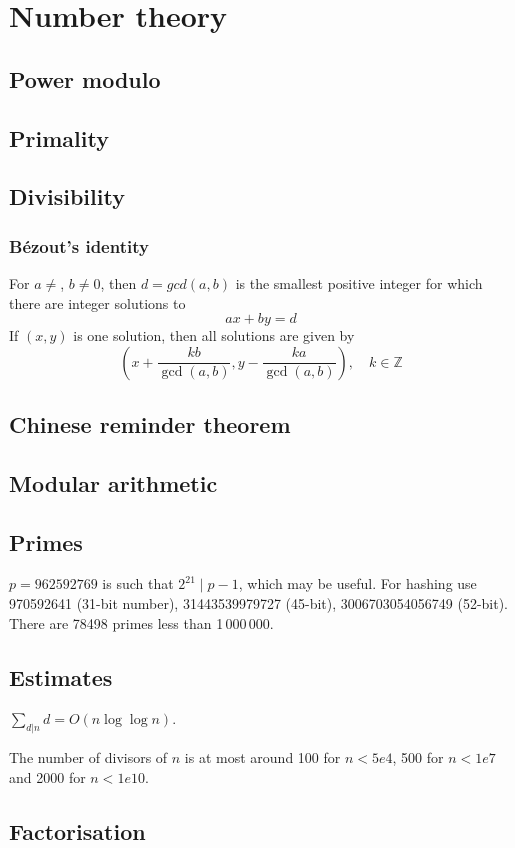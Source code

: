 
\chapter{Number theory}

	\section{Power modulo}

	\section{Primality}

	\section{Divisibility}
		\subsection{Bézout's identity}
		For $a \neq $, $b \neq 0$, then $d=gcd(a,b)$ is the smallest positive integer for which there are integer solutions to
		$$ax+by=d$$
		If $(x,y)$ is one solution, then all solutions are given by
		$$\left(x+\frac{kb}{\gcd(a,b)}, y-\frac{ka}{\gcd(a,b)}\right), \quad k\in\mathbb{Z}$$
		
		
		

	\section{Chinese reminder theorem}

	\section{Modular arithmetic}

	\section{Primes}
		$p=962592769$ is such that $2^{21} \mid p-1$, which may be useful. For hashing
		use 970592641 (31-bit number), 31443539979727 (45-bit), 3006703054056749
		(52-bit). There are 78498 primes less than 1\,000\,000.

	\section{Estimates}
		$\sum_{d|n} d = O(n \log \log n)$.

		The number of divisors of $n$ is at most around 100 for $n < 5e4$, 500 for $n < 1e7$ and 2000 for $n < 1e10$.

	\section{Factorisation}
